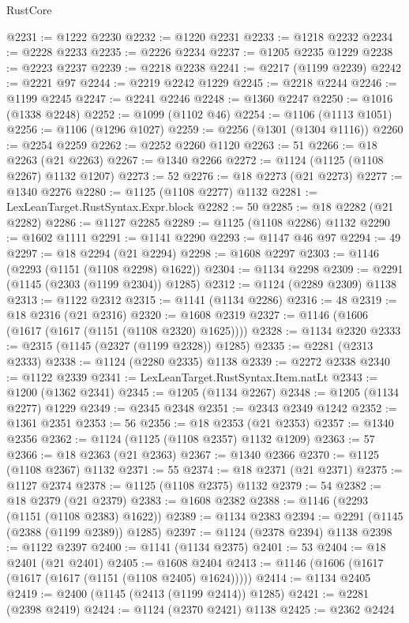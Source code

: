 \begin{lexlean}{RustCore}
\begin{coremodule}
@2231 := @1222 @2230
@2232 := @1220 @2231
@2233 := @1218 @2232
@2234 := @2228 @2233
@2235 := @2226 @2234
@2237 := @1205 @2235 @1229
@2238 := @2223 @2237
@2239 := @2218 @2238
@2241 := @2217 (@1199 @2239)
@2242 := @2221 @97
@2244 := @2219 @2242 @1229
@2245 := @2218 @2244
@2246 := @1199 @2245
@2247 := @2241 @2246
@2248 := @1360 @2247
@2250 := @1016 (@1338 @2248)
@2252 := @1099 (@1102 @46)
@2254 := @1106 (@1113 @1051)
@2256 := @1106 (@1296 @1027)
@2259 := @2256 (@1301 (@1304 @1116))
@2260 := @2254 @2259
@2262 := @2252 @2260 @1120
@2263 := 51
@2266 := @18 @2263 (@21 @2263)
@2267 := @1340 @2266
@2272 := @1124 (@1125 (@1108 @2267) @1132 @1207)
@2273 := 52
@2276 := @18 @2273 (@21 @2273)
@2277 := @1340 @2276
@2280 := @1125 (@1108 @2277) @1132
@2281 := LexLeanTarget.RustSyntax.Expr.block
@2282 := 50
@2285 := @18 @2282 (@21 @2282)
@2286 := @1127 @2285
@2289 := @1125 (@1108 @2286) @1132
@2290 := @1602 @1111
@2291 := @1141 @2290
@2293 := @1147 @46 @97
@2294 := 49
@2297 := @18 @2294 (@21 @2294)
@2298 := @1608 @2297
@2303 := @1146 (@2293 (@1151 (@1108 @2298) @1622))
@2304 := @1134 @2298
@2309 := @2291 (@1145 (@2303 (@1199 @2304)) @1285)
@2312 := @1124 (@2289 @2309) @1138
@2313 := @1122 @2312
@2315 := @1141 (@1134 @2286)
@2316 := 48
@2319 := @18 @2316 (@21 @2316)
@2320 := @1608 @2319
@2327 := @1146 (@1606 (@1617 (@1617 (@1151 (@1108 @2320) @1625))))
@2328 := @1134 @2320
@2333 := @2315 (@1145 (@2327 (@1199 @2328)) @1285)
@2335 := @2281 (@2313 @2333)
@2338 := @1124 (@2280 @2335) @1138
@2339 := @2272 @2338
@2340 := @1122 @2339
@2341 := LexLeanTarget.RustSyntax.Item.natLt
@2343 := @1200 (@1362 @2341)
@2345 := @1205 (@1134 @2267)
@2348 := @1205 (@1134 @2277) @1229
@2349 := @2345 @2348
@2351 := @2343 @2349 @1242
@2352 := @1361 @2351
@2353 := 56
@2356 := @18 @2353 (@21 @2353)
@2357 := @1340 @2356
@2362 := @1124 (@1125 (@1108 @2357) @1132 @1209)
@2363 := 57
@2366 := @18 @2363 (@21 @2363)
@2367 := @1340 @2366
@2370 := @1125 (@1108 @2367) @1132
@2371 := 55
@2374 := @18 @2371 (@21 @2371)
@2375 := @1127 @2374
@2378 := @1125 (@1108 @2375) @1132
@2379 := 54
@2382 := @18 @2379 (@21 @2379)
@2383 := @1608 @2382
@2388 := @1146 (@2293 (@1151 (@1108 @2383) @1622))
@2389 := @1134 @2383
@2394 := @2291 (@1145 (@2388 (@1199 @2389)) @1285)
@2397 := @1124 (@2378 @2394) @1138
@2398 := @1122 @2397
@2400 := @1141 (@1134 @2375)
@2401 := 53
@2404 := @18 @2401 (@21 @2401)
@2405 := @1608 @2404
@2413 := @1146 (@1606 (@1617 (@1617 (@1617 (@1151 (@1108 @2405) @1624)))))
@2414 := @1134 @2405
@2419 := @2400 (@1145 (@2413 (@1199 @2414)) @1285)
@2421 := @2281 (@2398 @2419)
@2424 := @1124 (@2370 @2421) @1138
@2425 := @2362 @2424

\end{coremodule}
\end{lexlean}
